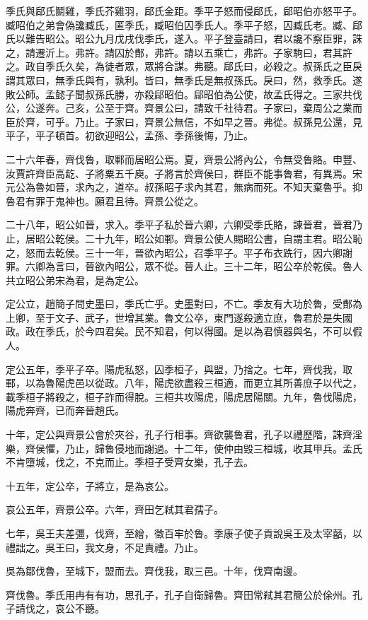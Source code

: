 季氏與郈氏鬬雞，季氏芥雞羽，郈氏金距。季平子怒而侵郈氏，郈昭伯亦怒平子。臧昭伯之弟會偽讒臧氏，匿季氏，臧昭伯囚季氏人。季平子怒，囚臧氏老。臧、郈氏以難告昭公。昭公九月戊戌伐季氏，遂入。平子登臺請曰，君以讒不察臣罪，誅之，請遷沂上。弗許。請囚於鄪，弗許。請以五乘亡，弗許。子家駒曰，君其許之。政自季氏久矣，為徒者眾，眾將合謀。弗聽。郈氏曰，必殺之。叔孫氏之臣戾謂其眾曰，無季氏與有，孰利。皆曰，無季氏是無叔孫氏。戾曰，然，救季氏。遂敗公師。孟懿子聞叔孫氏勝，亦殺郈昭伯。郈昭伯為公使，故孟氏得之。三家共伐公，公遂奔。己亥，公至于齊。齊景公曰，請致千社待君。子家曰，棄周公之業而臣於齊，可乎。乃止。子家曰，齊景公無信，不如早之晉。弗從。叔孫見公還，見平子，平子頓首。初欲迎昭公，孟孫、季孫後悔，乃止。

二十六年春，齊伐魯，取鄆而居昭公焉。夏，齊景公將內公，令無受魯賂。申豐、汝賈許齊臣高龁、子將粟五千庾。子將言於齊侯曰，群臣不能事魯君，有異焉。宋元公為魯如晉，求內之，道卒。叔孫昭子求內其君，無病而死。不知天棄魯乎。抑魯君有罪于鬼神也。願君且待。齊景公從之。

二十八年，昭公如晉，求入。季平子私於晉六卿，六卿受季氏賂，諫晉君，晉君乃止，居昭公乾侯。二十九年，昭公如鄆。齊景公使人賜昭公書，自謂主君。昭公恥之，怒而去乾侯。三十一年，晉欲內昭公，召季平子。平子布衣跣行，因六卿謝罪。六卿為言曰，晉欲內昭公，眾不從。晉人止。三十二年，昭公卒於乾侯。魯人共立昭公弟宋為君，是為定公。

定公立，趙簡子問史墨曰，季氏亡乎。史墨對曰，不亡。季友有大功於魯，受鄪為上卿，至于文子、武子，世增其業。魯文公卒，東門遂殺適立庶，魯君於是失國政。政在季氏，於今四君矣。民不知君，何以得國。是以為君慎器與名，不可以假人。

定公五年，季平子卒。陽虎私怒，囚季桓子，與盟，乃捨之。七年，齊伐我，取鄆，以為魯陽虎邑以從政。八年，陽虎欲盡殺三桓適，而更立其所善庶子以代之，載季桓子將殺之，桓子詐而得脫。三桓共攻陽虎，陽虎居陽關。九年，魯伐陽虎，陽虎奔齊，已而奔晉趙氏。

十年，定公與齊景公會於夾谷，孔子行相事。齊欲襲魯君，孔子以禮歷階，誅齊淫樂，齊侯懼，乃止，歸魯侵地而謝過。十二年，使仲由毀三桓城，收其甲兵。孟氏不肯墮城，伐之，不克而止。季桓子受齊女樂，孔子去。

十五年，定公卒，子將立，是為哀公。

哀公五年，齊景公卒。六年，齊田乞弒其君孺子。

七年，吳王夫差彊，伐齊，至繒，徵百牢於魯。季康子使子貢說吳王及太宰嚭，以禮詘之。吳王曰，我文身，不足責禮。乃止。

吳為鄒伐魯，至城下，盟而去。齊伐我，取三邑。十年，伐齊南邊。

齊伐魯。季氏用冉有有功，思孔子，孔子自衛歸魯。齊田常弒其君簡公於俆州。孔子請伐之，哀公不聽。

